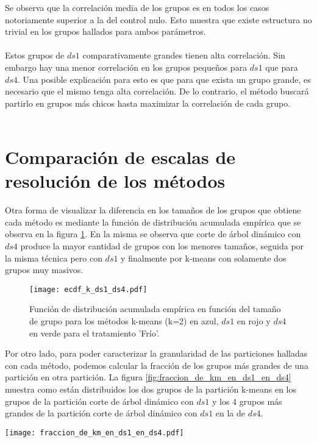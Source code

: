 Se observa que la correlación media de los grupos es en todos los casos notoriamente superior a la del control nulo. Esto muestra que existe estructura no trivial en los grupos hallados para ambos parámetros. \\\\
Estos grupos de $ds1$ comparativamente grandes tienen alta correlación. Sin embargo hay una menor correlación en los grupos pequeños para $ds1$ que para $ds4$. Una posible explicación para esto es que para que exista un grupo grande, es necesario que el mismo tenga alta correlación. De lo contrario, el método buscará partirlo en grupos más chicos hasta maximizar la correlación de cada grupo.\\\\
\clearpage
\section{Comparación de escalas de resolución de los métodos}
Otra forma de visualizar la diferencia en los tamaños de los grupos que obtiene cada método es mediante la función de distribución acumulada empírica que se observa en la figura \ref{fig:ecdf_k_ds1_ds4}. En la misma se observa que corte de árbol dinámico con $ds4$ produce la mayor cantidad de grupos con los menores tamaños, seguida por la misma técnica pero con $ds1$ y finalmente por k-means con solamente dos grupos muy masivos.
\begin{figure}[h]
    \centering
    \texttt{[image: ecdf\_k\_ds1\_ds4.pdf]}
    \caption{Función de distribución acumulada empírica en función del tamaño de grupo para los métodos k-means (k=2) en azul, $ds1$ en rojo y $ds4$ en verde para el tratamiento 'Frío'.}
    \label{fig:ecdf_k_ds1_ds4}
\end{figure}
Por otro lado, para poder caracterizar la granularidad de las particiones halladas con cada método, podemos calcular la fracción de los grupos más grandes de una partición en otra partición. La figura \ref{fig:fraccion_de_km_en_ds1_en_ds4} muestra como están distribuidos los dos grupos de la partición k-means en los grupos de la partición corte de árbol dinámico con $ds1$ y los 4 grupos más grandes de la partición corte de árbol dinámico con $ds1$ en la de $ds4$.
\begin{sidewaysfigure}
    \centering
    \texttt{[image: fraccion\_de\_km\_en\_ds1\_en\_ds4.pdf]}
    \caption{Fracción de grupos de una partición más fina dentro de grupos en una partición más gruesa para el tratamiento 'Frío', con $ds1$, $ds4$ y k-means. En rojo, aquellos subgrupos que están contenidos en más de un 50\% en el grupo. La linea punteada marca el porcentaje del grupo que representa el total del subgrupo.}
    \label{fig:fraccion_de_km_en_ds1_en_ds4}
\end{sidewaysfigure}
